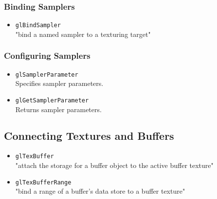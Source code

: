 \documentclass[12pt]{article}
\begin{document}
\subsubsection{Binding Samplers}
\begin{itemize}
\item \texttt{glBindSampler} \\
	"bind a named sampler to a texturing target"
\end{itemize}

\subsubsection{Configuring Samplers}
\begin{itemize}
\item \texttt{glSamplerParameter} \\
	Specifies sampler parameters.
\item \texttt{glGetSamplerParameter} \\
	Returns sampler parameters.
\end{itemize}



\subsection{Connecting Textures and Buffers}
\begin{itemize}
\item \texttt{glTexBuffer} \\
	"attach the storage for a buffer object to the active buffer texture"
\item \texttt{glTexBufferRange} \\
	"bind a range of a buffer's data store to a buffer texture"
\end{itemize}
\end{document}
